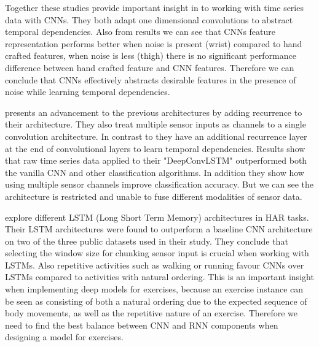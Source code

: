 Together these studies provide important insight in to working with time series data with CNNs. They both adapt one dimensional convolutions to abstract temporal dependencies. Also from  results we can see that CNNs feature representation performs better when noise is present (wrist) compared to hand crafted features, when noise is less (thigh) there is no significant performance difference between hand crafted feature and CNN features. Therefore we can conclude that CNNs effectively abstracts desirable features in the presence of noise while learning temporal dependencies.

 presents an advancement to the previous architectures by adding recurrence to their architecture. They also treat multiple sensor inputs as channels to a single convolution architecture. In contrast to  they have an additional recurrence layer at the end of convolutional layers to learn temporal dependencies. Results show that raw time series data applied to their "DeepConvLSTM" outperformed both the vanilla CNN and other classification algorithms. In addition they show how using multiple sensor channels improve classification accuracy. But we can see the architecture is restricted and unable to fuse different modalities of sensor data. 

 explore different LSTM (Long Short Term Memory) architectures in HAR tasks. Their LSTM architectures were found to outperform a baseline CNN architecture on two of the three public datasets used in their study. They conclude that selecting the window size for chunking sensor input is crucial when working with LSTMs. Also repetitive activities such as walking or running favour CNNs over LSTMs compared to activities with natural ordering. This is an important insight when implementing deep models for exercises, because an exercise instance can be seen as consisting of both a natural ordering due to the expected sequence of body movements, as well as the repetitive nature of an exercise. Therefore we need to find the best balance between CNN and RNN components when designing a model for exercises. 

